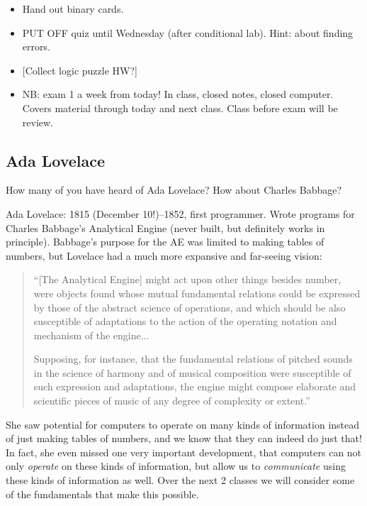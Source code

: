 \documentclass{article}
\begin{document}
\begin{itemize}
\item Hand out binary cards.
\item PUT OFF quiz until Wednesday (after conditional lab).  Hint:
  about finding errors.
\item{} [Collect logic puzzle HW?]
\item NB: exam 1 a week from today!  In class, closed notes, closed
  computer.  Covers material through today and next class. Class
  before exam will be review.
\end{itemize}

\subsection*{Ada Lovelace}

How many of you have heard of Ada Lovelace?  How about Charles
Babbage?

Ada Lovelace: 1815 (December 10!)--1852, first programmer.  Wrote
programs for Charles Babbage's Analytical Engine (never built, but
definitely works in principle).  Babbage's purpose for the AE was
limited to making tables of numbers, but Lovelace had a much more
expansive and far-seeing vision:

\begin{quote}
``[The Analytical Engine] might act upon other things besides number,
were objects found whose mutual fundamental relations could be
expressed by those of the abstract science of operations, and which
should be also susceptible of adaptations to the action of the
operating notation and mechanism of the engine...

Supposing, for instance, that the fundamental relations of pitched
sounds in the science of harmony and of musical composition were
susceptible of such expression and adaptations, the engine might
compose elaborate and scientific pieces of music of any degree of
complexity or extent.''
\end{quote}

She saw potential for computers to operate on many kinds of
information instead of just making tables of numbers, and we know that
they can indeed do just that!  In fact, she even missed one very
important development, that computers can not only \emph{operate} on
these kinds of information, but allow us to \emph{communicate} using
these kinds of information as well.  Over the next 2 classes we will
consider some of the fundamentals that make this possible.
\end{document}
